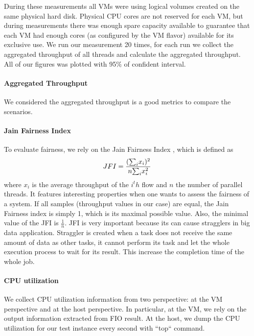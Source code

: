 \documentclass{acmsig}
\begin{document}
During these measurements all VMs were using logical volumes created on the same physical hard disk. Physical CPU cores are not reserved for each VM, but during measurements there was enough spare capacity available to guarantee that each VM had enough cores (as configured by the VM flavor) available for its exclusive use. We run our measurement 20 times, for each run we collect the aggregated throughput of all threads and calculate the aggregated throughput. All of our figures was plotted with 95\% of confident interval.

\paragraph{Aggregated Throughput}
  We considered the aggregated throughput is a good metrics to compare the scenarios. %

\paragraph{Jain Fairness Index}
  To evaluate fairness, we rely on the Jain Fairness Index \cite{jain98}, which is defined as
  $$JFI={({\sum}_{i}x_{i})^{2}\over n{\sum}_{i}x_{i}^{2}}$$
  where $x_{i}$ is the average throughput of the $i^th$ flow and $n$ the number of parallel threads. It features interesting properties when one wants to assess the fairness of a system. If all samples (throughput values in our case) are equal, the Jain Fairness index is simply 1, which is its maximal possible value. Also, the minimal value of the JFI is $\frac{1}{n}$. JFI is very important because its can cause stragglers in big data application. Straggler is created when a task does not receive the same amount of data as other tasks, it cannot perform its task and let the whole execution process to wait for its result. This increase the completion time of the whole job.

\paragraph{CPU utilization}

We collect CPU utilization information from two perspective: at the VM perspective and at the host perspective. In particular, at the VM, we rely on the output information extracted from FIO result. At the host, we dump the CPU utilization for our test instance every second with ``top`` command.

\end{document}
